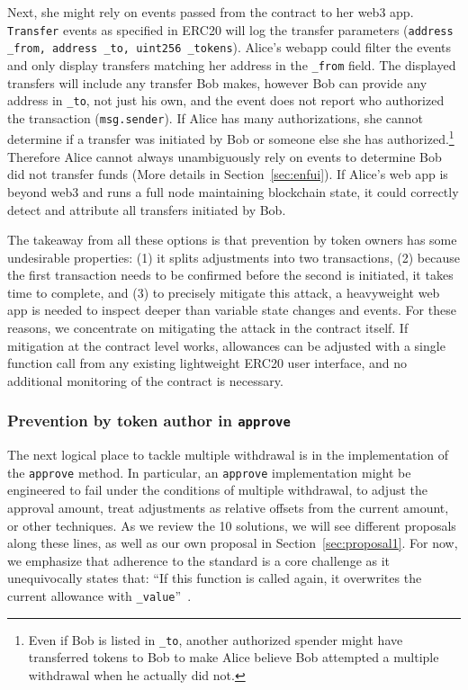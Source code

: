 Next, she might rely on events passed from the contract to her web3 app. \texttt{Transfer} events as specified in ERC20 will log the transfer parameters (\ie  \texttt{address \_from, address \_to, uint256 \_tokens}). Alice's webapp could filter the events and only display transfers matching her address in the \texttt{\_from} field. The displayed transfers will include any transfer Bob makes, however Bob can provide any address in \texttt{\_to}, not just his own, and the event does not report who authorized the transaction (\ie \texttt{msg.sender}). If Alice has many authorizations, she cannot determine if a transfer was initiated by Bob or someone else she has authorized.\footnote{Even if Bob is listed in \texttt{\_to}, another authorized spender might have transferred tokens to Bob to make Alice believe Bob attempted a multiple withdrawal when he actually did not.} Therefore Alice cannot always unambiguously rely on events to determine Bob did not transfer funds (More details in Section~\ref{sec:enfui}). If Alice's web app is beyond web3 and runs a full node maintaining blockchain state, it could correctly detect and attribute all transfers initiated by Bob. 

The takeaway from all these options is that prevention by token owners has some undesirable properties: (1) it splits adjustments into two transactions, (2) because the first transaction needs to be confirmed before the second is initiated, it takes time to complete, and (3) to precisely mitigate this attack, a heavyweight web app is needed to inspect deeper than variable state changes and events. For these reasons, we concentrate on mitigating the attack in the contract itself. If mitigation at the contract level works, allowances can be adjusted with a single function call from any existing lightweight ERC20 user interface, and no additional monitoring of the contract is necessary. 

	
\subsubsection*{Prevention by token author in \texttt{approve}} The next logical place to tackle multiple withdrawal is in the implementation of the \texttt{approve} method. In particular, an \texttt{approve} implementation might be engineered to fail under the conditions of multiple withdrawal, to adjust the approval amount, treat adjustments as relative offsets from the current amount, or other techniques. As we review the 10 solutions, we will see different proposals along these lines, as well as our own proposal in Section~\ref{sec:proposal1}. For now, we emphasize that adherence to the standard is a core challenge as it unequivocally states that: ``If this function is called again, it overwrites the current allowance with \texttt{\_value}''~\cite{Ref08}. 


